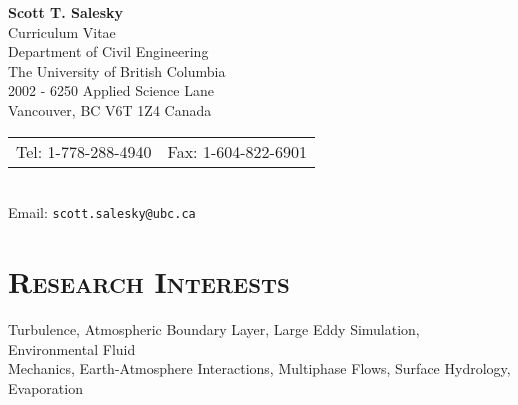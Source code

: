 \documentclass[11pt,letterpaper]{article}
\begin{document}

\pagestyle{empty}           %
\pagestyle{fancy}
\fancyfoot{}                        %
\fancyhead{}                        %
\renewcommand{\headrulewidth}{0pt}

\begin{center}
    \textbf{\Large Scott T. Salesky} \\
    {\Large{Curriculum Vitae}} \\ \smallskip
    Department of Civil Engineering \\
    The University of British Columbia \\
    2002 - 6250 Applied Science Lane \\
    Vancouver, BC V6T 1Z4 Canada \\
    \begin{tabular}{c c}
        Tel: 1-778-288-4940 & Fax: 1-604-822-6901
    \end{tabular} \\
    Email: \texttt{scott.salesky@ubc.ca}
\end{center}

\section*{\textsc{Research Interests}} 

Turbulence, Atmospheric Boundary Layer, Large Eddy Simulation, Environmental Fluid \\ Mechanics,
Earth-Atmosphere Interactions, Multiphase Flows, Surface Hydrology, Evaporation 


\end{document}
